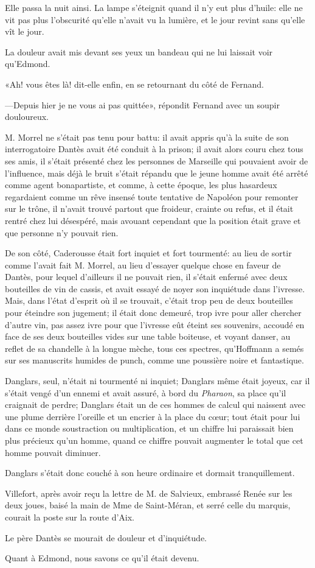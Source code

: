 Elle passa la nuit ainsi. La lampe s'éteignit quand il n'y eut plus d'huile: elle ne vit pas plus l'obscurité qu'elle n'avait vu la lumière, et le jour revint sans qu'elle vît le jour.

La douleur avait mis devant ses yeux un bandeau qui ne lui laissait voir qu'Edmond.

«Ah! vous êtes là! dit-elle enfin, en se retournant du côté de Fernand.

—Depuis hier je ne vous ai pas quittée», répondit Fernand avec un soupir douloureux.

M. Morrel ne s'était pas tenu pour battu: il avait appris qu'à la suite de son interrogatoire Dantès avait été conduit à la prison; il avait alors couru chez tous ses amis, il s'était présenté chez les personnes de Marseille qui pouvaient avoir de l'influence, mais déjà le bruit s'était répandu que le jeune homme avait été arrêté comme agent bonapartiste, et comme, à cette époque, les plus hasardeux regardaient comme un rêve insensé toute tentative de Napoléon pour remonter sur le trône, il n'avait trouvé partout que froideur, crainte ou refus, et il était rentré chez lui désespéré, mais avouant cependant que la position était grave et que personne n'y pouvait rien.

De son côté, Caderousse était fort inquiet et fort tourmenté: au lieu de sortir comme l'avait fait M. Morrel, au lieu d'essayer quelque chose en faveur de Dantès, pour lequel d'ailleurs il ne pouvait rien, il s'était enfermé avec deux bouteilles de vin de cassis, et avait essayé de noyer son inquiétude dans l'ivresse. Mais, dans l'état d'esprit où il se trouvait, c'était trop peu de deux bouteilles pour éteindre son jugement; il était donc demeuré, trop ivre pour aller chercher d'autre vin, pas assez ivre pour que l'ivresse eût éteint ses souvenirs, accoudé en face de ses deux bouteilles vides sur une table boiteuse, et voyant danser, au reflet de sa chandelle à la longue mèche, tous ces spectres, qu'Hoffmann a semés sur ses manuscrits humides de punch, comme une poussière noire et fantastique.

Danglars, seul, n'était ni tourmenté ni inquiet; Danglars même était joyeux, car il s'était vengé d'un ennemi et avait assuré, à bord du \textit{Pharaon}, sa place qu'il craignait de perdre; Danglars était un de ces hommes de calcul qui naissent avec une plume derrière l'oreille et un encrier à la place du cœur; tout était pour lui dans ce monde soustraction ou multiplication, et un chiffre lui paraissait bien plus précieux qu'un homme, quand ce chiffre pouvait augmenter le total que cet homme pouvait diminuer.

Danglars s'était donc couché à son heure ordinaire et dormait tranquillement.

Villefort, après avoir reçu la lettre de M. de Salvieux, embrassé Renée sur les deux joues, baisé la main de Mme de Saint-Méran, et serré celle du marquis, courait la poste sur la route d'Aix.

Le père Dantès se mourait de douleur et d'inquiétude.

Quant à Edmond, nous savons ce qu'il était devenu.



